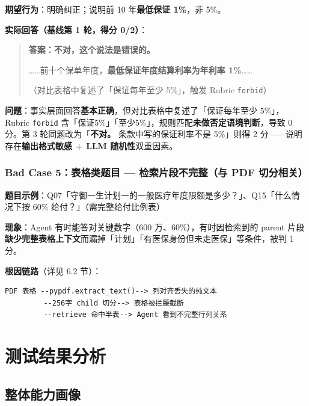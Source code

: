 \documentclass[11pt,a4paper]{ctexart}
\begin{document}
\textbf{期望行为}：明确纠正；说明前 10 年\textbf{最低保证 1\%}，非 5\%。

\textbf{实际回答（基线第 1 轮，得分 0/2）}：

\begin{quote}
\textbf{答案：不对，这个说法是错误的。}

……前十个保单年度，\textbf{最低保证年度结算利率为年利率 1\%}……

（对比表格中复述了「保证每年至少 5\%」，触发 Rubric \texttt{forbid}）
\end{quote}

\textbf{问题}：事实层面回答\textbf{基本正确}，但对比表格中复述了「保证每年至少 5\%」，Rubric \texttt{forbid} 含「保证5\%」「至少5\%」，规则匹配\textbf{未做否定语境判断}，导致 0 分。第 3 轮同题改为「\textbf{不对。} 条款中写的保证利率不是 5\%」则得 2 分——说明存在\textbf{输出格式敏感 + LLM 随机性}双重因素。

\subsubsection{Bad Case 5：表格类题目 — 检索片段不完整（与 PDF 切分相关）}

\textbf{题目示例}：Q07「守御一生计划一的一般医疗年度限额是多少？」、Q15「什么情况下按 60\% 给付？」（需完整给付比例表）

\textbf{现象}：Agent 有时能答对关键数字（600 万、60\%），有时因检索到的 parent 片段\textbf{缺少完整表格上下文}而漏掉「计划」「有医保身份但未走医保」等条件，被判 1 分。

\textbf{根因链路}（详见 6.2 节）：

\begin{lstlisting}
PDF 表格 --pypdf.extract_text()--> 列对齐丢失的纯文本
         --256字 child 切分--> 表格被拦腰截断
         --retrieve 命中半表--> Agent 看到不完整行列关系
\end{lstlisting}

\section{测试结果分析}

\subsection{整体能力画像}
\end{document}
